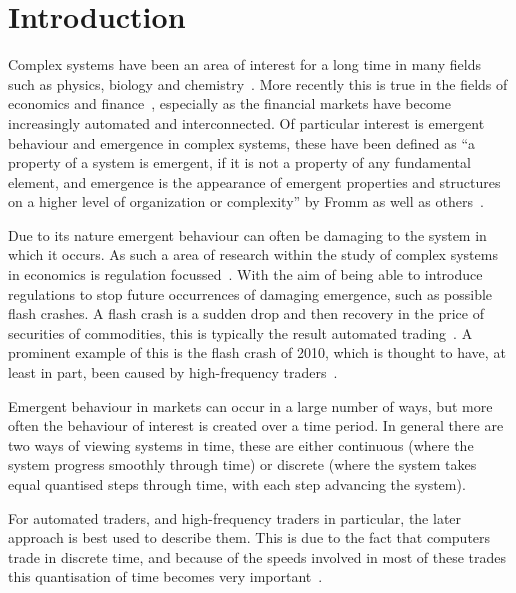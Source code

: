 \documentclass{article}
\begin{document}
\newpage
{}
\tableofcontents
{\textit{ }}
\restoregeometry
\newpage









\section{Introduction}
Complex systems have been an area of interest for a long time in many  fields such as physics, biology and chemistry~\cite{oldcps}. More recently this is true in the fields of economics and finance~\cite{complexecon}, especially as the financial markets have become increasingly automated and interconnected. Of particular interest is emergent behaviour and emergence in complex systems, these have been defined as ``a property of a system is emergent, if it is not a property of any fundamental element, and emergence is the appearance of emergent properties and structures on a higher level of organization or complexity'' by Fromm as well as others~\cite{bubblesandcrashes, emergdef, emegdefs2}.

Due to its nature emergent behaviour can often be damaging to the system in which it occurs. As such a area of research within the study of complex systems in economics is regulation focussed~\cite{regemergnce}. With the aim of being able to introduce regulations to stop future occurrences of damaging emergence, such as possible flash crashes. A flash crash is a sudden drop and then recovery in the price of securities of commodities, this is typically the result automated trading~\cite{flashauto}. A prominent example of this is the flash crash of 2010, which is thought to have, at least in part, been caused by high-frequency traders~\cite{SECreport_delays, DynamicCoupling_Chris}. 

Emergent behaviour in markets can occur in a large number of ways, but more often the behaviour of interest is created over a time period. In general there are two ways of viewing systems in time, these are either continuous (where the system progress smoothly through time) or discrete (where the system takes equal quantised steps through time, with each step advancing the system).

For automated traders, and high-frequency traders in particular, the later approach is best used to describe them. This is due to the fact that computers trade in discrete time, and because of the speeds involved in most of these trades this quantisation of time becomes very important~\cite{discretetiem}. 
\end{document}
